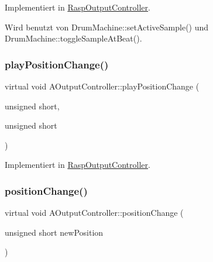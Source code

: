 Implementiert in \hyperlink{class_rasp_output_controller_af0304196681872f9c1f6d6f2e2db14a6}{Rasp\+Output\+Controller}.



Wird benutzt von Drum\+Machine\+::set\+Active\+Sample() und Drum\+Machine\+::toggle\+Sample\+At\+Beat().

\mbox{\label{class_a_output_controller_a15c1300df5606bf7d4838b41a45c31e3}} 
\subsubsection{\texorpdfstring{play\+Position\+Change()}{playPositionChange()}\hspace{0.1cm}{\footnotesize\ttfamily [2/2]}}
{\footnotesize\ttfamily virtual void A\+Output\+Controller\+::play\+Position\+Change (\begin{DoxyParamCaption}\item[{unsigned}]{short,  }\item[{unsigned}]{short }\end{DoxyParamCaption})\hspace{0.3cm}{\ttfamily [pure virtual]}}



Implementiert in \hyperlink{class_rasp_output_controller_a0778395ee8ec044d04fbfcb2f3b2eb04}{Rasp\+Output\+Controller}.

\mbox{\label{class_a_output_controller_a5a818a40e2911411d378032b8b2fb6c8}} 
\subsubsection{\texorpdfstring{position\+Change()}{positionChange()}}
{\footnotesize\ttfamily virtual void A\+Output\+Controller\+::position\+Change (\begin{DoxyParamCaption}\item[{unsigned short}]{new\+Position }\end{DoxyParamCaption})\hspace{0.3cm}{\ttfamily [pure virtual]}}



